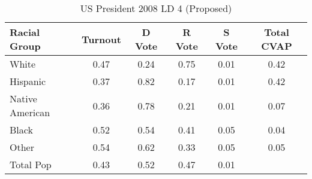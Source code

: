 \begin{table}[htb]
\begin{center}
\caption{US President 2008 LD 4 (Proposed)}
\label{pres08_cvap_ld_4}
\begin{tabular}{lccccc}
  \hline
Racial Group & Turnout & D Vote & R Vote & S Vote & Total CVAP \\ 
  \hline
White & 0.47 & 0.24 & 0.75 & 0.01 & 0.42 \\ 
  Hispanic & 0.37 & 0.82 & 0.17 & 0.01 & 0.42 \\ 
  Native American & 0.36 & 0.78 & 0.21 & 0.01 & 0.07 \\ 
  Black & 0.52 & 0.54 & 0.41 & 0.05 & 0.04 \\ 
  Other & 0.54 & 0.62 & 0.33 & 0.05 & 0.05 \\ 
  Total Pop & 0.43 & 0.52 & 0.47 & 0.01 &  \\ 
   \hline
\end{tabular}
\end{center}
\end{table}
